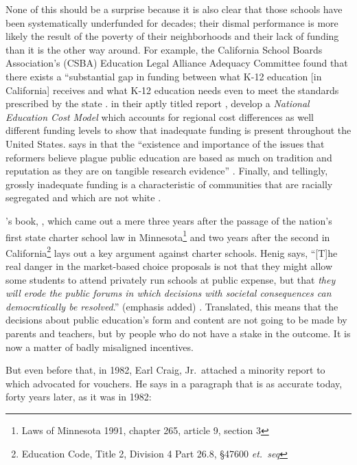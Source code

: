 None of this should be a surprise because it is also clear that those schools have been systematically underfunded for decades; their dismal performance is more likely the result of the poverty of their neighborhoods and their lack of funding than it is the other way around. For example, the California School Boards Association's (CSBA) Education Legal Alliance Adequacy Committee found that there exists a ``substantial gap in funding between what K-12 education [in California] receives and what K-12 education needs even to meet the standards prescribed by the state \parencite[\textit{iii}]{Bray2015}. \textcite{Baker.etal2018} in their aptly titled report , develop a \textit{National Education Cost Model} \parencite%
{Baker.etal2018} which accounts for regional cost differences as well different funding levels to show that inadequate funding is present throughout the United States. \textcite{Garcia2018} says in  that the ``existence and importance of the issues that reformers believe plague public education are based as much on tradition and reputation as they are on tangible research evidence'' \parencite[54]{Garcia2018}. Finally, and tellingly, grossly inadequate funding is a characteristic of communities that are racially segregated and which are not white \parencite{Darling-Hammond2012, Rothstein2017}.

\textcite{Henig1994}'s book, , which came out a mere three years after the passage of the nation's first state charter school law in Minnesota\footnote{Laws of Minnesota 1991, chapter 265, article 9, section 3} and two years after the second in California\footnote{Education Code, Title 2, Division 4 Part 26.8, §47600 \textit{et.\ seq}} lays out a key argument against charter schools. Henig says, ``[T]he real danger in the market-based choice proposals is not that they might allow some students to attend privately run schools at public expense, but that \emph{they will erode the public forums in which decisions with societal consequences can democratically be resolved}.'' (emphasis added) \parencite[\emph{xiii}]{Henig1994}. Translated, this means that the decisions about public education's form and content are not going to be made by parents and teachers, but by people who do not have a stake in the outcome. It is now a matter of badly misaligned incentives. %

But even before that, in 1982, Earl Craig, Jr.\ attached a minority report to  which advocated for vouchers. He says in a paragraph that is as accurate today, forty years later, as it was in 1982: 

